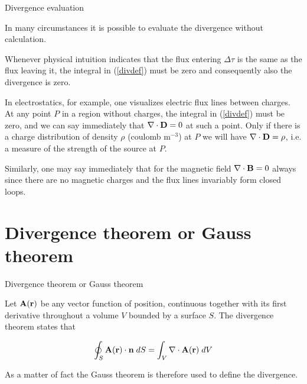 \documentclass[handout,10pt]{beamer}
\begin{document}
\begin{frame}[shrink=00]{Divergence evaluation}

In many circumstances it is possible to evaluate the divergence \alert{without calculation}. 

Whenever \alert{physical intuition} indicates that the flux entering $\Delta \tau$
is the same as the flux leaving it, the integral in (\ref{divdef}) must be zero and consequently also the divergence is zero. 

\pause
In \alert{electrostatics}, for example, one visualizes electric flux lines between charges. At any point $P$  in a  region without charges, the integral in  (\ref{divdef}) must be zero, and we can say immediately that $\nabla \cdot \mathbf{D}=0$  at such a point. Only if there is a charge distribution of density $\rho$ (\si{coulomb} \si{\meter}$^{-3}$) at $P$ we will have $\nabla \cdot \mathbf{D}=\rho$, i.e. a \alert{measure of the strength of the source} at $P$.

\pause
Similarly, one may say immediately that \alert{for the magnetic field} $\nabla \cdot \mathbf{B}=0$ always since there are no magnetic charges and the flux lines invariably form closed loops.


\end{frame}

\section{Divergence theorem or Gauss theorem}

\begin{frame}[shrink=00]{Divergence theorem or Gauss theorem}

%
Let ${\bf A}({\bf r})$ be any vector function of position, continuous
together with its first derivative throughout a volume $V$ bounded by a
surface $S$. The divergence theorem states that

%
\begin{equation}
\oint_{S} {\bf A}({\bf r}) \cdot {\bf n} \; dS =
\int_{V} \nabla \cdot {\bf A}({\bf r})  \; dV
\label{divergenceq}
\end{equation}
%

As a matter of fact the \alert{Gauss theorem is therefore used to define the
divergence}.

\end{frame}
\end{document}
